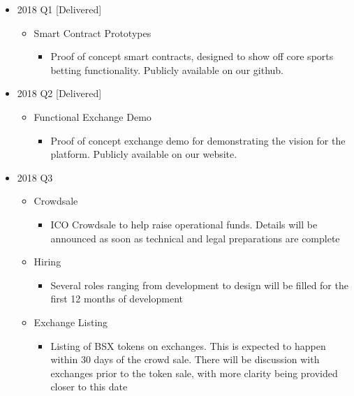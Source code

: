 \documentclass{article}
\begin{document}
\begin{itemize}
   
   \item 2018 Q1 [Delivered]
   \begin{itemize}
     \item Smart Contract Prototypes
     	\begin{itemize}
     		\item Proof of concept smart contracts, designed to show off core sports betting functionality. Publicly available on our github.
     	\end{itemize}
   \end{itemize}

   \item 2018 Q2 [Delivered]
   \begin{itemize}
     \item Functional Exchange Demo
     	\begin{itemize}
     		\item Proof of concept exchange demo for demonstrating the vision for the platform. Publicly available on our website.
     	\end{itemize}
   \end{itemize} 

   \item 2018 Q3
   \begin{itemize}
     \item Crowdsale
     	\begin{itemize}
     		\item ICO Crowdsale to help raise operational funds. Details will be announced as soon as technical and legal preparations are complete
     	\end{itemize}
     \item Hiring
     	\begin{itemize}
     		\item Several roles ranging from development to design will be filled for the first 12 months of development
     	\end{itemize}
      \item Exchange Listing
     	\begin{itemize}
     		\item Listing of BSX tokens on exchanges. This is expected to happen within 30 days of the crowd sale. There will be discussion with exchanges prior to the token sale, with more clarity being provided closer to this date
     	\end{itemize}
   \end{itemize} 
   

\end{itemize}
\end{document}
